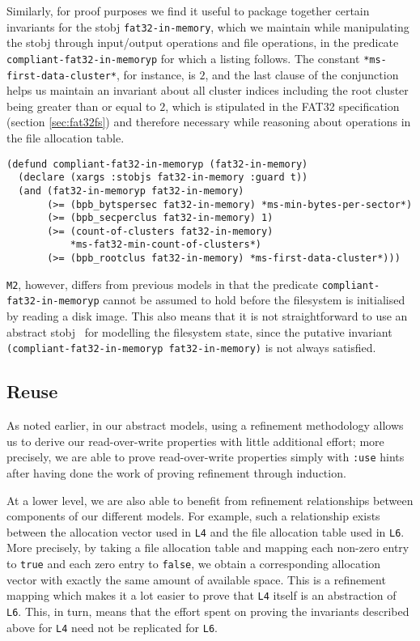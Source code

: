 \documentclass[submission,copyright,creativecommons]{eptcs}
\begin{document}
Similarly, for proof purposes we find it useful to package together
certain invariants for the stobj \texttt{fat32-in-memory}, which we
maintain while manipulating the stobj through input/output operations
and file operations, in the predicate
\texttt{compliant-fat32-in-memoryp} for which a listing follows. The
constant \texttt{*ms-first-data-cluster*}, for instance, is $2$, and
the last clause of the conjunction helps us maintain an invariant
about all cluster indices including the root cluster being greater
than or equal to $2$, which is stipulated in the FAT32 specification
(section \ref{sec:fat32fs}) and therefore necessary while reasoning
about operations in the file allocation table.

\medskip

\noindent
\begin{verbatim}
(defund compliant-fat32-in-memoryp (fat32-in-memory)
  (declare (xargs :stobjs fat32-in-memory :guard t))
  (and (fat32-in-memoryp fat32-in-memory)
       (>= (bpb_bytspersec fat32-in-memory) *ms-min-bytes-per-sector*)
       (>= (bpb_secperclus fat32-in-memory) 1)
       (>= (count-of-clusters fat32-in-memory)
           *ms-fat32-min-count-of-clusters*)
       (>= (bpb_rootclus fat32-in-memory) *ms-first-data-cluster*)))
\end{verbatim}

\texttt{M2}, however, differs from previous models in that the
predicate \texttt{compliant-fat32-in-memoryp} cannot be assumed to
hold before the filesystem is initialised by reading a disk
image. This also means that it is not straightforward to use an
abstract stobj~\cite{goel2013abstract} for modelling the filesystem
state, since the putative invariant
\texttt{(compliant-fat32-in-memoryp fat32-in-memory)} is not always
satisfied.

\subsection{Reuse}

As noted earlier, in our abstract models, using a refinement
methodology allows us to derive our read-over-write properties
with little additional effort; more precisely, we are able to prove
read-over-write properties simply with \texttt{:use} hints after
having done the work of proving refinement through induction.

At a lower level, we are also able to benefit from refinement
relationships between components of our different models. For example,
such a relationship exists between the allocation vector used in
\texttt{L4} and the file allocation table used in \texttt{L6}. More
precisely, by taking a file allocation table and mapping each non-zero
entry to \texttt{true} and each zero entry to \texttt{false}, we
obtain a corresponding allocation vector with exactly the same amount
of available space. This is a refinement mapping which makes it a lot
easier to prove that \texttt{L4} itself is an abstraction of
\texttt{L6}. This, in turn, means that the effort spent on proving the
invariants described above for \texttt{L4} need not be replicated for
\texttt{L6}.
\end{document}
